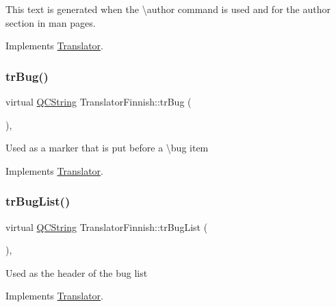 This text is generated when the \textbackslash{}author command is used and for the author section in man pages. 

Implements \mbox{\hyperlink{class_translator}{Translator}}.

\mbox{\label{class_translator_finnish_aec8cc083696468600c43a7cad27e9a05}} 
\subsubsection{\texorpdfstring{trBug()}{trBug()}}
{\footnotesize\ttfamily virtual \mbox{\hyperlink{class_q_c_string}{Q\+C\+String}} Translator\+Finnish\+::tr\+Bug (\begin{DoxyParamCaption}{ }\end{DoxyParamCaption})\hspace{0.3cm}{\ttfamily [inline]}, {\ttfamily [virtual]}}

Used as a marker that is put before a \textbackslash{}bug item 

Implements \mbox{\hyperlink{class_translator}{Translator}}.

\mbox{\label{class_translator_finnish_a7c8a169cb777c885549c101d30c38b43}} 
\subsubsection{\texorpdfstring{trBugList()}{trBugList()}}
{\footnotesize\ttfamily virtual \mbox{\hyperlink{class_q_c_string}{Q\+C\+String}} Translator\+Finnish\+::tr\+Bug\+List (\begin{DoxyParamCaption}{ }\end{DoxyParamCaption})\hspace{0.3cm}{\ttfamily [inline]}, {\ttfamily [virtual]}}

Used as the header of the bug list 

Implements \mbox{\hyperlink{class_translator}{Translator}}.

\mbox{\label{class_translator_finnish_aaba3d7a2b3ebb583128bfb4b1d9f4377}} 
